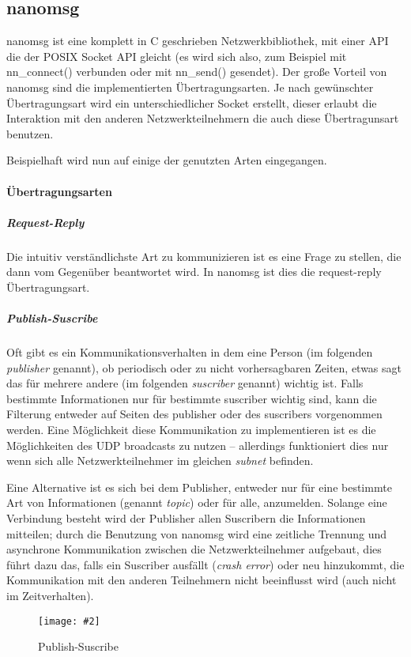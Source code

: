 \documentclass[
    12pt,
    bibliography=totoc,
    ngerman
]{scrartcl}
\newcommand{\includevisio}[2][]{\texttt{[image: \#2]}}
\begin{document}
\clearpage %
\subsection{nanomsg}
nanomsg ist eine komplett in C geschrieben Netzwerkbibliothek, mit einer API die der POSIX Socket API gleicht (es wird sich also, zum Beispiel mit nn\_connect() verbunden oder mit nn\_send() gesendet).
Der gro{\ss}e Vorteil von nanomsg sind die implementierten {\"{U}}bertragungsarten. Je nach gew{\"{u}}nschter {\"{U}}bertragungsart wird ein unterschiedlicher Socket erstellt, dieser erlaubt die
Interaktion mit den anderen Netzwerkteilnehmern die auch diese {\"{U}}bertragunsart benutzen.

Beispielhaft wird nun auf einige der genutzten Arten eingegangen.

\paragraph{{\"{U}}bertragungsarten}
\subparagraph{Request-Reply} Die intuitiv verst{\"{a}}ndlichste Art zu kommunizieren ist es eine Frage zu stellen, die dann vom Gegen{\"{u}}ber beantwortet wird. In nanomsg ist dies die request-reply
{\"{U}}bertragungsart.

\subparagraph{Publish-Suscribe} Oft gibt es ein Kommunikationsverhalten in dem eine Person (im folgenden \textit{publisher} genannt), ob periodisch oder zu nicht vorhersagbaren Zeiten, etwas sagt
das f{\"{u}}r mehrere andere (im folgenden \textit{suscriber} genannt) wichtig ist. Falls bestimmte Informationen nur f{\"{u}}r bestimmte suscriber wichtig sind, kann die Filterung entweder auf Seiten des publisher oder des suscribers vorgenommen werden.
Eine M{\"{o}}glichkeit diese Kommunikation zu implementieren ist es die M{\"{o}}glichkeiten des UDP broadcasts zu nutzen -- allerdings funktioniert dies nur wenn sich alle Netzwerkteilnehmer im gleichen
\textit{subnet} befinden.

Eine Alternative ist es sich bei dem Publisher, entweder nur f{\"{u}}r eine bestimmte Art von Informationen (genannt \textit{topic}) oder f{\"{u}}r alle, anzumelden. Solange eine Verbindung besteht
wird der Publisher allen Suscribern die Informationen mitteilen; durch die Benutzung von nanomsg wird eine zeitliche Trennung und asynchrone Kommunikation zwischen die Netzwerkteilnehmer aufgebaut,
dies f{\"{u}}hrt dazu das, falls ein Suscriber ausf{\"{a}}llt (\textit{crash error}) oder neu hinzukommt, die Kommunikation mit den anderen Teilnehmern nicht beeinflusst wird (auch nicht im Zeitverhalten).
\begin{figure}
	\centering
	\includevisio[width=\textwidth]{pubsub}
	\caption{Publish-Suscribe}
	\label{fig:pubsub}
\end{figure}
\end{document}
